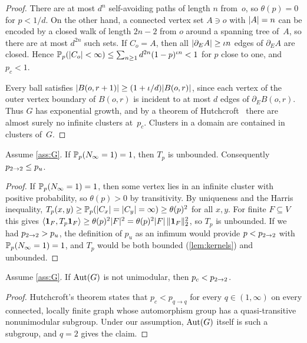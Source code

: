 \begin{proof}
There are at most $d^n$ self-avoiding paths of length $n$ from~$o$, so $\theta(p)=0$ for $p<1/d$. On the
other hand, a connected vertex set $A\ni o$ with $\lvert A\rvert=n$ can be encoded by a closed walk of length
$2n-2$ from $o$ around a spanning tree of~$A$, so there are at most $d^{2n}$ such sets. If $C_o=A$, then
all $\lvert\partial_E A\rvert\ge\iota n$ edges of $\partial_EA$ are closed. Hence
$\mathbb P_p(\lvert C_o\rvert<\infty)\le\sum_{n\ge1}d^{2n}(1-p)^{\iota n}<1$ for $p$ close to one, and $p_c<1$.

Every ball satisfies $\lvert B(o,r+1)\rvert\ge(1+\iota/d)\lvert B(o,r)\rvert$, since each vertex of the outer vertex
boundary of $B(o,r)$ is incident to at most $d$ edges of $\partial_EB(o,r)$. Thus $G$ has exponential
growth, and by a theorem of Hutchcroft~\cite[Theorem~1.2]{Hut16} there are almost surely no infinite
clusters at~$p_c$. Clusters in a domain are contained in clusters of~$G$.
\end{proof}

\begin{lemma}\label{lem:p22-pu}
Assume \cref{ass:G}. If $\mathbb P_p(N_\infty=1)=1$, then $T_p$ is unbounded. Consequently $p_{2\to 2}\le p_u$.
\end{lemma}

\begin{proof}
If $\mathbb P_p(N_\infty=1)=1$, then some vertex lies in an infinite cluster with positive probability, so
$\theta(p)>0$ by transitivity. By uniqueness and the Harris inequality,
$T_p(x,y)\ge\mathbb P_p(\lvert C_x\rvert=\lvert C_y\rvert=\infty)\ge\theta(p)^2$ for all $x,y$. For finite $F\subseteq V$
this gives $\langle\mathbf{1}_F,T_p\mathbf{1}_F\rangle\ge\theta(p)^2\lvert F\rvert^2=\theta(p)^2\lvert F\rvert\,\lVert\mathbf{1}_F\rVert_2^2$, so
$T_p$ is unbounded. If we had $p_{2\to 2}>p_u$, the definition of $p_u$ as an infimum would provide
$p<p_{2\to 2}$ with $\mathbb P_p(N_\infty=1)=1$, and $T_p$ would be both bounded (\cref{lem:kernels}) and
unbounded.
\end{proof}

\begin{proposition}\label{prop:nonunimodular}
Assume \cref{ass:G}. If $\operatorname{Aut}(G)$ is not unimodular, then $p_c<p_{2\to 2}$.
\end{proposition}

\begin{proof}
Hutchcroft's theorem states that $p_c<p_{q\to q}$ for every $q\in(1,\infty)$ on every connected, locally
finite graph whose automorphism group has a quasi-transitive nonunimodular subgroup. Under our
assumption, $\operatorname{Aut}(G)$ itself is such a subgroup, and $q=2$ gives the claim.
\end{proof}

